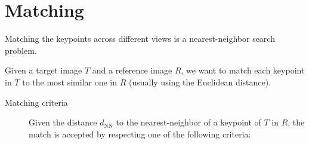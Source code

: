 \section{Matching}

Matching the keypoints across different views is a nearest-neighbor search problem. 

Given a target image $T$ and a reference image $R$,
we want to match each keypoint in $T$ to the most similar one in $R$ (usually using the Euclidean distance).

\begin{description}
    \item[Matching criteria] 
        Given the distance $d_\text{NN}$ to the nearest-neighbor of a keypoint of $T$ in $R$,
        the match is accepted by respecting one of the following criteria:
\end{description}
